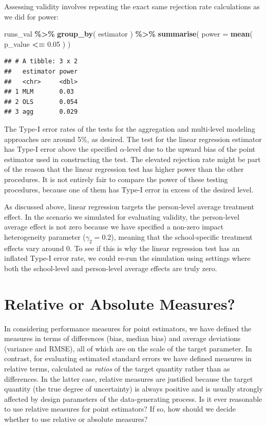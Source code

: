 \documentclass[
]{book}
\newenvironment{Shaded}{\begin{snugshade}}{\end{snugshade}}
\newcommand{\AttributeTok}[1]{\textcolor[rgb]{0.13,0.29,0.53}{#1}}
\newcommand{\FloatTok}[1]{\textcolor[rgb]{0.00,0.00,0.81}{#1}}
\newcommand{\FunctionTok}[1]{\textcolor[rgb]{0.13,0.29,0.53}{\textbf{#1}}}
\newcommand{\NormalTok}[1]{#1}
\newcommand{\SpecialCharTok}[1]{\textcolor[rgb]{0.81,0.36,0.00}{\textbf{#1}}}
\begin{document}
Assessing validity involves repeating the exact same rejection rate calculations as we did for power:

\begin{Shaded}
\begin{Highlighting}[]
\NormalTok{runs\_val }\SpecialCharTok{\%\textgreater{}\%} 
  \FunctionTok{group\_by}\NormalTok{( estimator ) }\SpecialCharTok{\%\textgreater{}\%}
  \FunctionTok{summarise}\NormalTok{( }\AttributeTok{power =} \FunctionTok{mean}\NormalTok{( p\_value }\SpecialCharTok{\textless{}=} \FloatTok{0.05}\NormalTok{ ) )}
\end{Highlighting}
\end{Shaded}

\begin{verbatim}
## # A tibble: 3 x 2
##   estimator power
##   <chr>     <dbl>
## 1 MLM       0.03 
## 2 OLS       0.054
## 3 agg       0.029
\end{verbatim}

The Type-I error rates of the tests for the aggregation and multi-level modeling approaches are around 5\%, as desired.
The test for the linear regression estimator has Type-I error above the specified \(\alpha\)-level due to the upward bias of the point estimator used in constructing the test.
The elevated rejection rate might be part of the reason that the linear regression test has higher power than the other procedures.
It is not entirely fair to compare the power of these testing procedures, because one of them has Type-I error in excess of the desired level.

As discussed above, linear regression targets the person-level average treatment effect.
In the scenario we simulated for evaluating validity, the person-level average effect is not zero because we have specified a non-zero impact heterogeneity parameter (\(\gamma_2=0.2\)), meaning that the school-specific treatment effects vary around 0.
To see if this is why the linear regression test has an inflated Type-I error rate, we could re-run the simulation using settings where both the school-level and person-level average effects are truly zero.

\section{Relative or Absolute Measures?}\label{sec-relative-performance}

In considering performance measures for point estimators, we have defined the measures in terms of differences (bias, median bias) and average deviations (variance and RMSE), all of which are on the scale of the target parameter.
In contrast, for evaluating estimated standard errors we have defined measures in relative terms, calculated as \emph{ratios} of the target quantity rather than as differences.
In the latter case, relative measures are justified because the target quantity (the true degree of uncertainty) is always positive and is usually strongly affected by design parameters of the data-generating process.
Is it ever reasonable to use relative measures for point estimators? If so, how should we decide whether to use relative or absolute measures?
\end{document}
